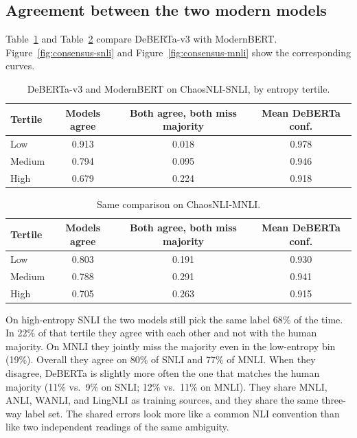 \documentclass[11pt,a4paper]{article}
\begin{document}
\subsection{Agreement between the two modern models}

Table~\ref{tab:pair-snli} and Table~\ref{tab:pair-mnli} compare DeBERTa-v3 with ModernBERT. Figure~\ref{fig:consensus-snli} and Figure~\ref{fig:consensus-mnli} show the corresponding curves.

\begin{table}[H]
\centering
\small
\caption{DeBERTa-v3 and ModernBERT on ChaosNLI-SNLI, by entropy tertile.}
\label{tab:pair-snli}
\begin{tabular}{lccc}
\toprule
Tertile & Models agree & Both agree, both miss majority & Mean DeBERTa conf. \\
\midrule
Low & 0.913 & 0.018 & 0.978 \\
Medium & 0.794 & 0.095 & 0.946 \\
High & 0.679 & 0.224 & 0.918 \\
\bottomrule
\end{tabular}
\end{table}

\begin{table}[H]
\centering
\small
\caption{Same comparison on ChaosNLI-MNLI.}
\label{tab:pair-mnli}
\begin{tabular}{lccc}
\toprule
Tertile & Models agree & Both agree, both miss majority & Mean DeBERTa conf. \\
\midrule
Low & 0.803 & 0.191 & 0.930 \\
Medium & 0.788 & 0.291 & 0.941 \\
High & 0.705 & 0.263 & 0.915 \\
\bottomrule
\end{tabular}
\end{table}

On high-entropy SNLI the two models still pick the same label 68\% of the time. In 22\% of that tertile they agree with each other and not with the human majority. On MNLI they jointly miss the majority even in the low-entropy bin (19\%). Overall they agree on 80\% of SNLI and 77\% of MNLI. When they disagree, DeBERTa is slightly more often the one that matches the human majority (11\% vs.\ 9\% on SNLI; 12\% vs.\ 11\% on MNLI). They share MNLI, ANLI, WANLI, and LingNLI as training sources, and they share the same three-way label set. The shared errors look more like a common NLI convention than like two independent readings of the same ambiguity.
\end{document}
